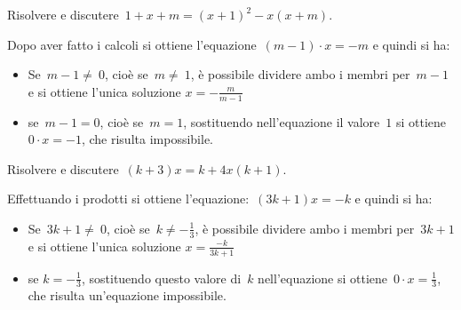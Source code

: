 
 \begin{esempio}{}{}
Risolvere e discutere~\(1+x+m=(x+1)^{2}-x(x+m)\).

Dopo aver fatto i calcoli si ottiene l'equazione~\((m-1)\cdot x=-m\) e 
quindi si ha:
\begin{itemize}[nosep]
\item Se~\(m-1\neq~0\), cioè se~\(m\neq~1\), è possibile dividere ambo 
i membri per~\(m-1\) e si ottiene l'unica soluzione 
\(x=-{\frac{m}{m-1}}\)
\item se~\(m-1=0\), cioè se~\(m=1\), sostituendo nell'equazione il 
valore~\(1\) si ottiene~\(0\cdot x=-1\), che risulta impossibile.
\end{itemize}
\end{esempio}

\begin{esempio}{}{}
Risolvere e discutere~\((k+3)x=k+4x(k+1)\).

Effettuando i prodotti si ottiene l'equazione:~\((3k+1)x=-k\) e quindi 
si ha:
\begin{itemize}[nosep]
\item Se~\(3k+1\neq~0\), cioè se~\(k\neq -{\frac{1}{3}}\), è possibile 
dividere ambo i membri per~\(3k+1\) e si ottiene l'unica 
soluzione \(x=\frac{-k}{3k+1}\)
\item se \(k=-{\frac{1}{3}}\), sostituendo questo valore di~\(k\) 
nell'equazione si ottiene~\(0\cdot x=\frac{1}{3}\), che risulta 
un'equazione impossibile.
\end{itemize}
\end{esempio}


